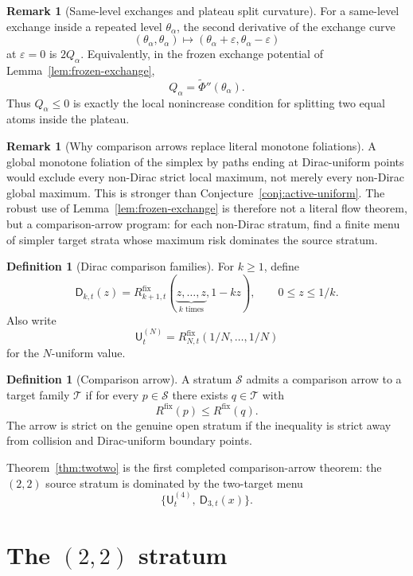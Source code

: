 \documentclass[11pt]{article}
\theoremstyle{definition}
\newtheorem{definition}[theorem]{Definition}
\newtheorem{remark}[theorem]{Remark}
\newcommand{\fix}{\mathrm{fix}}
\begin{document}
\begin{remark}[Same-level exchanges and plateau split curvature]\label{rem:Q-exchange}
For a same-level exchange inside a repeated level $\theta_\alpha$, the
second derivative of the exchange curve
\[
  (\theta_\alpha,\theta_\alpha)
  \mapsto
  (\theta_\alpha+\varepsilon,\theta_\alpha-\varepsilon)
\]
at $\varepsilon=0$ is $2Q_\alpha$.  Equivalently, in the frozen exchange
potential of Lemma~\ref{lem:frozen-exchange},
\[
  Q_\alpha=\widetilde\Phi''(\theta_\alpha).
\]
Thus $Q_\alpha\le0$ is exactly the local nonincrease condition for splitting
two equal atoms inside the plateau.
\end{remark}

\begin{remark}[Why comparison arrows replace literal monotone foliations]
A global monotone foliation of the simplex by paths ending at Dirac-uniform
points would exclude every non-Dirac strict local maximum, not merely every
non-Dirac global maximum.  This is stronger than Conjecture~\ref{conj:active-uniform}.
The robust use of Lemma~\ref{lem:frozen-exchange} is therefore not a literal
flow theorem, but a comparison-arrow program: for each non-Dirac stratum,
find a finite menu of simpler target strata whose maximum risk dominates the
source stratum.
\end{remark}

\begin{definition}[Dirac comparison families]\label{def:Dk}
For $k\ge1$, define
\[
  \mathsf D_{k,t}(z)
  =R_{k+1,t}^{\fix}(\underbrace{z,\ldots,z}_{k\text{ times}},1-kz),
  \qquad 0\le z\le 1/k.
\]
Also write
\[
  \mathsf U^{(N)}_t=R_{N,t}^{\fix}(1/N,\ldots,1/N)
\]
for the $N$-uniform value.
\end{definition}

\begin{definition}[Comparison arrow]\label{def:comparison-arrow}
A stratum $\mathcal S$ admits a comparison arrow to a target family
$\mathcal T$ if for every $p\in\mathcal S$ there exists $q\in\mathcal T$
with
\[
  R^{\fix}(p)\le R^{\fix}(q).
\]
The arrow is strict on the genuine open stratum if the inequality is strict
away from collision and Dirac-uniform boundary points.
\end{definition}

Theorem~\ref{thm:twotwo} is the first completed comparison-arrow theorem:
the $(2,2)$ source stratum is dominated by the two-target menu
\[
  \{\mathsf U^{(4)}_t,\ \mathsf D_{3,t}(x)\}.
\]

\section{The $(2,2)$ stratum}
\end{document}
